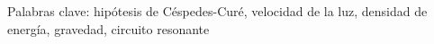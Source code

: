 \documentclass[pregrado]{tesis-usb}
\begin{document}
\begin{resumen}





Palabras clave: hipótesis de Céspedes-Curé, velocidad de la luz, densidad de energía, gravedad, circuito resonante

\end{resumen}
\tableofcontents
\listoffigures
\listoftables
\useacronyms


\mainmatter







\appendix




\end{document}
